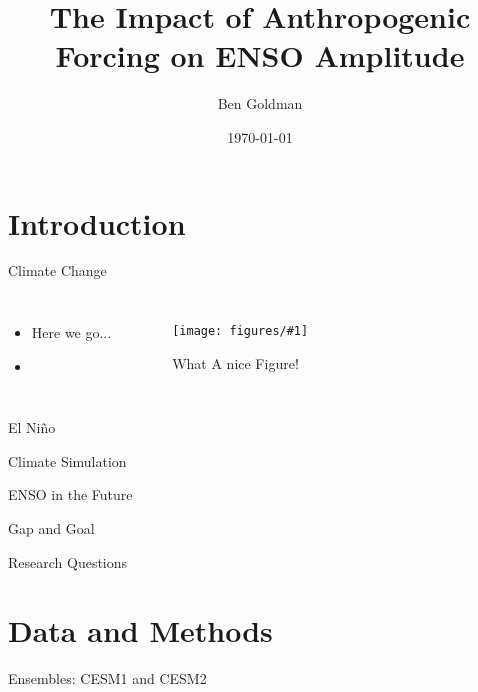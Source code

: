 \documentclass{beamer}
\title{The Impact of Anthropogenic Forcing on ENSO Amplitude}
\author{Ben Goldman}
\date{\today}
\newcommand{\myfig}[3]{
  \begin{figure}
    \centering
    \texttt{[image: figures/\#1]}
    \caption{#2}
    \label{fig:#3}
  \end{figure}
}
\begin{document}
\maketitle

\section{Introduction}

\begin{frame}{Climate Change}

  \begin{columns}
    \begin{itemize}
    \item Here we go...
    \item \cite{bjerknes1969atmospheric}
    \end{itemize}
    \myfig{example.jpg}{What A nice Figure!}{this}
  \end{columns}
\end{frame}

\begin{frame}{El Niño}

\end{frame}

\begin{frame}{Climate Simulation}

\end{frame}

\begin{frame}{ENSO in the Future}
\end{frame}

\begin{frame}{Gap and Goal}

\end{frame}

\begin{frame}{Research Questions}

\end{frame}

\section{Data and Methods}

\begin{frame}{Ensembles: CESM1 and CESM2}

\end{frame}
\end{document}
